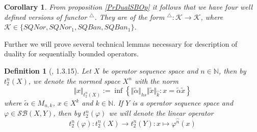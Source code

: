 \documentclass[12pt]{article}
\newtheorem{corollary}[theorem]{Corollary}
\newtheorem{definition}[theorem]{Definition}
\begin{document}
\begin{corollary}\label{CorDualFunc}
From proposition \ref{PrDualSBOp} it follows that we have four well defined versions of functor ${}^\triangle$. They are of the form ${}^\triangle:\mathcal{K}\to\mathcal{K}$, where $\mathcal{K}\in\{SQNor,SQNor_1,SQBan,SQBan_1\}$. 
\end{corollary}

Further we will prove several technical lemmas necessary for description of duality for sequentially bounded operators.

\begin{definition}[\cite{LamOpFolgen}, 1.3.15]\label{DefT2n}
Let $X$ be operator sequence space and $n\in\mathbb{N}$, then by $t_2^n(X)$, we denote the normed space $X^n$ with the norm
$$
\Vert x\Vert_{t_2^n(X)}:=\inf\left\{\Vert\tilde{\alpha}\Vert_{hs}\Vert \tilde{x}\Vert_{\wideparen{k}}:x=\tilde{\alpha} \tilde{x}\right\}
$$
where $\tilde{\alpha}\in M_{n,k}$, $x\in X^k$ and $k\in\mathbb{N}$. If $Y$ is a operator sequence space and $\varphi\in\mathcal{SB}(X,Y)$, then by $t_2^n(\varphi)$ we will denote the linear operator
$$
t_2^n(\varphi): t_2^n(X)\to t_2^n(Y): x\mapsto \varphi^{\wideparen{n}}(x)
$$
\end{definition}
\end{document}
